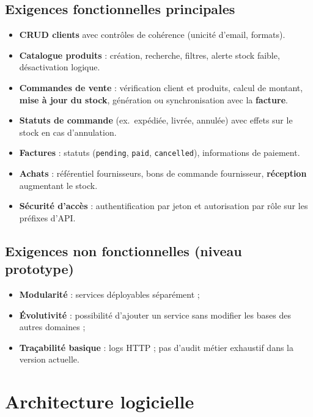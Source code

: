 \documentclass[11pt,a4paper]{article}
\begin{document}
\subsection{Exigences fonctionnelles principales}
\begin{itemize}[noitemsep]
  \item \textbf{CRUD clients} avec contrôles de cohérence (unicité d'email, formats).
  \item \textbf{Catalogue produits} : création, recherche, filtres, alerte stock faible, désactivation logique.
  \item \textbf{Commandes de vente} : vérification client et produits, calcul de montant, \textbf{mise à jour du stock}, génération ou synchronisation avec la \textbf{facture}.
  \item \textbf{Statuts de commande} (ex.\ expédiée, livrée, annulée) avec effets sur le stock en cas d'annulation.
  \item \textbf{Factures} : statuts (\texttt{pending}, \texttt{paid}, \texttt{cancelled}), informations de paiement.
  \item \textbf{Achats} : référentiel fournisseurs, bons de commande fournisseur, \textbf{réception} augmentant le stock.
  \item \textbf{Sécurité d'accès} : authentification par jeton et autorisation par rôle sur les préfixes d'API.
\end{itemize}

\subsection{Exigences non fonctionnelles (niveau prototype)}
\begin{itemize}[noitemsep]
  \item \textbf{Modularité} : services déployables séparément ;
  \item \textbf{Évolutivité} : possibilité d'ajouter un service sans modifier les bases des autres domaines ;
  \item \textbf{Traçabilité basique} : logs HTTP ; pas d'audit métier exhaustif dans la version actuelle.
\end{itemize}

\section{Architecture logicielle}
\end{document}
